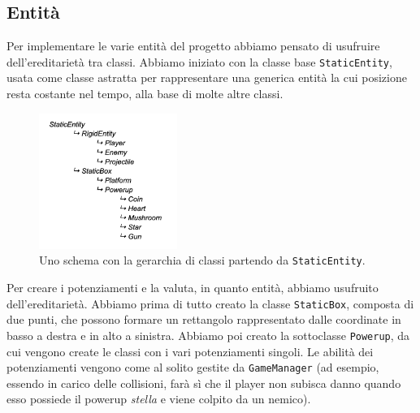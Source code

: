\documentclass[a4paper,12pt]{article}
\begin{document}
\subsection{Entità}
Per implementare le varie entità del progetto abbiamo pensato di usufruire dell'ereditarietà tra classi. Abbiamo iniziato con la classe base \texttt{StaticEntity}, usata come classe astratta per rappresentare una generica entità la cui posizione resta costante nel tempo, alla base di molte altre classi.
\begin{figure}
\centering
\includegraphics[width=0.4\textwidth]{hierarchy.png}
\captionsetup{labelformat=empty}
\caption{\small Uno schema con la gerarchia di classi partendo da \texttt{StaticEntity}.}
\end{figure}


Per creare i potenziamenti e la valuta, in quanto entità, abbiamo usufruito dell'ereditarietà. Abbiamo prima di tutto creato la classe \texttt{StaticBox}, composta di due punti, che possono formare un rettangolo rappresentato dalle coordinate in basso a destra e in alto a sinistra.
Abbiamo poi creato la sottoclasse \texttt{Powerup}, da cui vengono create le classi con i vari potenziamenti singoli. Le abilità dei potenziamenti vengono come al solito gestite da \texttt{GameManager} (ad esempio, essendo in carico delle collisioni, farà sì che il player non subisca danno quando esso possiede il powerup \textit{stella} e viene colpito da un nemico).\\
\end{document}
